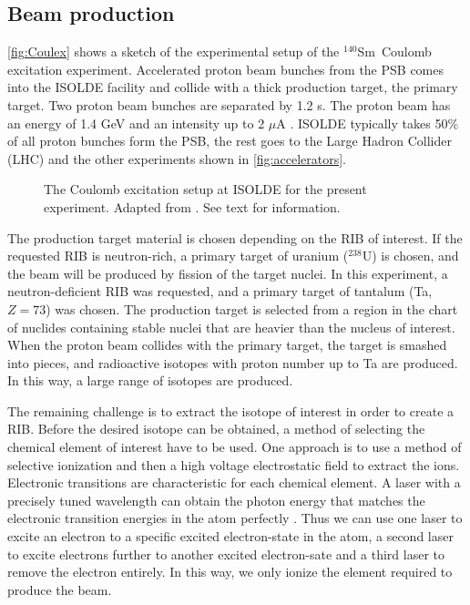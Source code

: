 \documentclass[twoside,english]{uiofysmaster/uiofysmaster}
\newcommand{\Sm}{$^{140}$Sm} %
\let\orgautoref\autoref
\renewcommand{\autoref}
        {%
		 \def\sectionautorefname{Section}%
		 \def\subsectionautorefname{Section}%
		 \def\subsubsectionautorefname{Section}%
		 \def\chapterautorefname{Chapter}%
          \orgautoref}
\begin{document}
\subsection{Beam production}\label{ssec:beam_prod}
\autoref{fig:Coulex} shows a sketch of the experimental setup of the \Sm\ Coulomb excitation experiment. 
Accelerated proton beam bunches from the PSB comes into the ISOLDE facility and collide with a thick production target, the primary target. 
Two proton beam bunches are separated by 1.2 s.
The proton beam has an energy of 1.4 GeV and an intensity up to 2 $\mu$A \cite{TIF, TIF2013}. 
ISOLDE typically takes 50\% \cite{MB-spect} of all proton bunches form the PSB, the rest goes to the Large Hadron Collider (LHC) and the other experiments shown in \autoref{fig:accelerators}. 

\begin{figure}[ht]
	\centering
	
	\caption{The Coulomb excitation setup at ISOLDE for the present experiment. Adapted from \cite{Klintefjord}. See text for information.}
	\label{fig:Coulex}
\end{figure}

The production target material is chosen depending on the RIB of interest. 
If the requested RIB is neutron-rich, a primary target of uranium ($^{238}$U) is chosen, and the beam will be produced by fission of the target nuclei.
In this experiment, a neutron-deficient RIB was requested, and a primary target of tantalum (Ta, $Z = 73$) was chosen.
The production target is selected from a region in the chart of nuclides containing stable nuclei that are heavier than the nucleus of interest.
When the proton beam collides with the primary target, the target is smashed into pieces, and radioactive isotopes with proton number up to Ta are produced.
In this way, a large range of isotopes are produced. 

The remaining challenge is to extract the isotope of interest in order to create a RIB. 
Before the desired isotope can be obtained, a method of selecting the chemical element of interest have to be used.
One approach is to use a method of selective ionization and then a high voltage electrostatic field to extract the ions. 
Electronic transitions are characteristic for each chemical element. 
A laser with a precisely tuned wavelength can obtain the photon energy that matches the electronic transition energies in the atom perfectly \cite{RILIS-web, RILIS2013}. 
Thus we can use one laser to excite an electron to a specific excited electron-state in the atom, a second laser to excite electrons further to another excited electron-sate and a third laser to remove the electron entirely. 
In this way, we only ionize the element required to produce the beam. 
\end{document}
